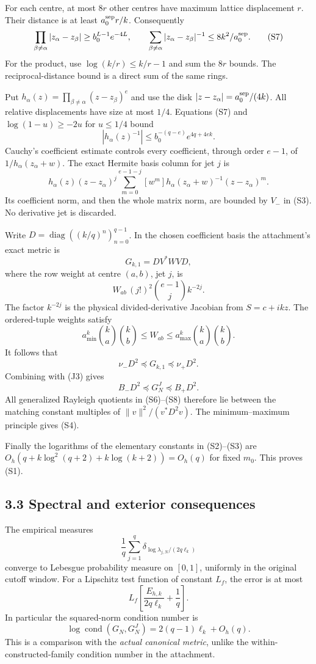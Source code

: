 For each centre, at most \(8r\) other centres have maximum lattice displacement \(r\). Their distance is at least \(a_0^{\rm sep}r/k\). Consequently \[
 \prod_{\beta\ne\alpha}|z_\alpha-z_\beta|
 \ge b_0^{L-1}e^{-4L},\qquad
 \sum_{\beta\ne\alpha}|z_\alpha-z_\beta|^{-1}
 \le8k^2/a_0^{\rm sep}. \tag{S7}
\] For the product, use \(\log(k/r)\le k/r-1\) and sum the \(8r\) bounds. The reciprocal-distance bound is a direct sum of the same rings.

Put \(h_\alpha(z)=\prod_{\beta\ne\alpha}(z-z_\beta)^e\) and use the disk \(|z-z_\alpha|=a_0^{\rm sep}/(4k)\). All relative displacements have size at most \(1/4\). Equations (S7) and \(\log(1-u)\ge-2u\) for \(u\le1/4\) bound \[
 |h_\alpha(z)^{-1}|
 \le b_0^{-(q-e)}e^{4q+4ek}.
\] Cauchy's coefficient estimate controls every coefficient, through order \(e-1\), of \(1/h_\alpha(z_\alpha+w)\). The exact Hermite basis column for jet \(j\) is \[
 h_\alpha(z)(z-z_\alpha)^j
 \sum_{m=0}^{e-1-j}
 [w^m]h_\alpha(z_\alpha+w)^{-1}(z-z_\alpha)^m.
\] Its coefficient norm, and then the whole matrix norm, are bounded by \(V_-\) in (S3). No derivative jet is discarded.

Write \(D=\operatorname{diag}((k/q)^n)_{n=0}^{q-1}\). In the chosen coefficient basis the attachment's exact metric is \[
 G_{k,1}=D V^*W V D,
\] where the row weight at centre \((a,b)\), jet \(j\), is \[
 W_{ab}\,(j!)^2\binom{e-1}{j}k^{-2j}.
\] The factor \(k^{-2j}\) is the physical divided-derivative Jacobian from \(S=c+ikz\). The ordered-tuple weights satisfy \[
 a_{\min}^k\binom ka\binom kb
 \le W_{ab}\le
 a_{\max}^k\binom ka\binom kb.
\] It follows that \[
 \nu_-D^2\preceq G_{k,1}\preceq\nu_+D^2.
\] Combining with (J3) gives \[
 B_-D^2\preceq G_N^J\preceq B_+D^2. \tag{S8}
\] All generalized Rayleigh quotients in (S6)--(S8) therefore lie between the matching constant multiples of \(\|v\|^2/(v^*D^2v)\). The minimum--maximum principle gives (S4).

Finally the logarithms of the elementary constants in (S2)--(S3) are \(O_h(q+k\log^2(q+2)+k\log(k+2))=O_h(q)\) for fixed \(m_0\). This proves (S1).

\subsection{3.3 Spectral and exterior consequences}\label{spectral-and-exterior-consequences}

The empirical measures \[
 \frac1q\sum_{j=1}^q
 \delta_{\log\lambda_{j,N}/(2q\ell_k)}
\] converge to Lebesgue probability measure on \([0,1]\), uniformly in the original cutoff window. For a Lipschitz test function of constant \(L_f\), the error is at most \[
 L_f\left[\frac{E_{h,k}}{2q\ell_k}+\frac1q\right]. \tag{S9}
\] In particular the squared-norm condition number is \[
 \boxed{
 \log\operatorname{cond}(G_N,G_N^J)
 =2(q-1)\ell_k+O_h(q).
 } \tag{S10}
\] This is a comparison with the \emph{actual canonical metric}, unlike the within-constructed-family condition number in the attachment.

